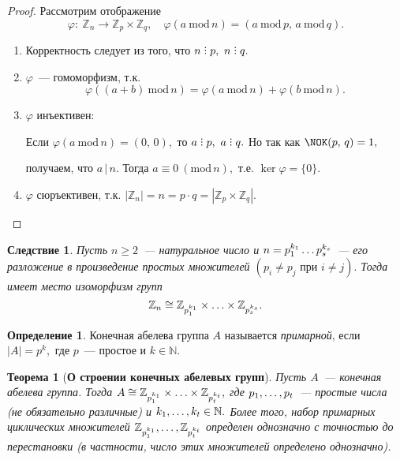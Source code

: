 \documentclass[a4paper, 14pt]{extarticle}
\newcommand{\n}{\par}
\newcommand{\integers}{\mathbb{Z}}
\newcommand{\naturals}{\mathbb{N}}
\DeclareRobustCommand{\divby}{%
	\mathrel{\text{\vbox{\baselineskip.65ex\lineskiplimit0pt\hbox{.}\hbox{.}\hbox{.}}}}%
}
\renewcommand{\phi}{\varphi}
\renewcommand{\mod}{\mathrm{mod} \,}
\theoremstyle{definition}
\newtheorem{definition}{Определение}
\theoremstyle{plain}
\newtheorem*{theorem*}{Теорема}
\numberwithin{theorem}{section}
\numberwithin{definition}{section}
\numberwithin{statement}{section}
\numberwithin{lemma}{section}
\newtheorem*{consequence*}{Следствие}
\numberwithin{consequence}{section}
\begin{document}
		\begin{proof}
			Рассмотрим отображение
			\begin{equation*}
				\phi{:} \ \integers_n \rightarrow \integers_p \times \integers_q, \quad \phi(a \ \mod n) = (a \ \mod p, \, a \ \mod q).
			\end{equation*}
			\begin{enumerate}
				\setlength\itemsep{0.1em}
				\item Корректность следует из того, что $n \divby p, \ n \divby q.$
				\item $\phi$~--- гомоморфизм, т.к.
				\begin{equation*}
					\phi((a + b) \ \mod n) = \phi(a \ \mod n) + \phi(b \ \mod n).
				\end{equation*}
				\item $\phi$ инъективен: \n
				Если ${\phi(a \ \mod n) =(0, \, 0),}$ то ${a \divby p, \ a \divby q.}$ Но так как ${\NOK(p, \, q) = 1,}$ \n
				получаем, что $a \, | \, n.$ Тогда ${a \equiv 0 \ (\mod n),}$ т.е. ${\ker \phi = \{0\}.}$
				\item $\phi$ сюръективен, т.к. ${|\integers_n| = n = p \cdot q = |\integers_p \times \integers_q|.}$ \qedhere
			\end{enumerate}
		\end{proof}
		\begin{consequence*}
			Пусть ${n \geqslant 2}$~--- натуральное число и ${n = p^{k_1}_1 \mathellipsis p^{k_s}_s}$~--- его разложение в произведение простых множителей ${(p_i \neq p_j \text{ при } i \neq j).}$ Тогда имеет место изоморфизм групп
			\begin{equation*}
				\integers_n \cong \integers_{p^{k_1}_1} \times \mathellipsis \times \integers_{p^{k_s}_s}.
			\end{equation*}
		\end{consequence*}
		\begin{definition}
			Конечная абелева группа $A$ называется \textit{примарной}, если ${|A| = p^k,}$ где $p$~--- простое и ${k \in \naturals.}$
		\end{definition}
		\begin{theorem*}[\textbf{О строении конечных абелевых групп}]
			Пусть $A$~--- конечная абелева группа. Тогда ${A \cong \integers_{p^{k_1}_1} \times \mathellipsis \times \integers_{p^{k_t}_t},}$ где ${p_1, \mathellipsis, p_t}$~--- простые числа (не обязательно различные) и ${k_1, \mathellipsis, k_t \in \naturals.}$ Более того, набор примарных циклических множителей ${\integers_{p^{k_1}_1}, \mathellipsis, \integers_{p^{k_t}_t}}$ определен однозначно с точностью до перестановки (в частности, число этих множителей определено однозначно).
		\end{theorem*}
	\newpage
\end{document}
